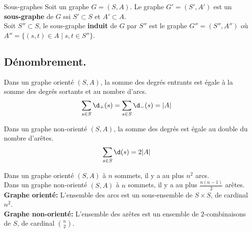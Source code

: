 \documentclass[french, 11pt]{article}
\begin{document}
\vspace*{-0.8cm}

\begin{defi}{Sous-graphes}{}
    Soit un graphe $G=(S,A)$. Le graphe $G'=(S',A')$ est un \textbf{sous-graphe} de $G$ ssi $S'\subset S$ et $A'\subset A$.\\
    Soit $S''\subset S$, le sous-graphe \textbf{induit} de $G$ par $S''$ est le graphe $G''=(S'',A'')$ où $A''=\{(s,t)\in A\mid s,t\in S''\}$.
\end{defi}

\vspace*{-0.8cm}

\subsection{Dénombrement.}

\begin{prop}{}{}
    Dans un graphe orienté $(S,A)$, la somme des degrés entrants est égale à la somme des degrés sortants et au nombre d'arcs.
    \begin{equation*}
        \sum_{s\in S}\d_+(s)=\sum_{s\in S}\d_-(s)=|A|
    \end{equation*}
\end{prop}

\vspace*{-0.8cm}

\begin{prop}{}{}
    Dans un graphe non-orienté $(S,A)$, la somme des degrés est égale au double du nombre d'arêtes.
    \begin{equation*}
        \sum_{s\in S}\d(s)=2|A|
    \end{equation*} 
\end{prop}

\vspace*{-0.8cm}

\begin{prop}{}{}
    Dans un graphe orienté $(S,A)$ à $n$ sommets, il y a au plus $n^2$ arcs.\\
    Dans un graphe non-orienté $(S,A)$ à $n$ sommets, il y a au plus $\frac{n(n-1)}{2}$ arêtes.
    \tcblower
    \textbf{Graphe orienté:} L'ensemble des arcs est un sous-ensemble de $S\times S$, de cardinal $n^2$.\\
    \textbf{Graphe non-orienté:} L'ensemble des arêtes est un ensemble de $2$-combinaisons de $S$, de cardinal $\binom{n}{2}$.
\end{prop}

\vspace*{-0.8cm}
\end{document}
